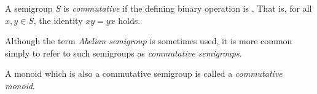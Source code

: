 \documentclass[12pt]{article}
\begin{document}

A semigroup $S$ is \emph{commutative} if the defining binary operation is .  That is, for all $x, y \in S$, the identity $xy = yx$ holds.

Although the term \emph{Abelian semigroup} is sometimes used, it is more common simply to refer to such semigroups as \emph{commutative semigroups}.

A monoid which is also a commutative semigroup is called a \emph{commutative monoid}.
\end{document}
